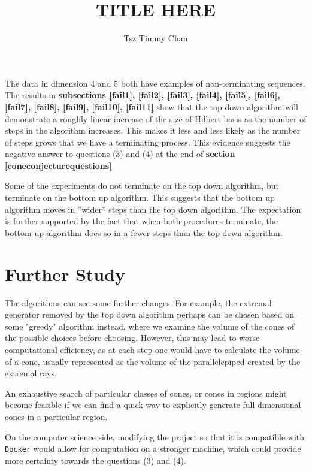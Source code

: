 \documentclass{TC}
\title{TITLE HERE}	%
\author{Tsz Timmy Chan}	%
\begin{document}
The data in dimension 4 and 5 both have examples of non-terminating sequences. The results in \textbf{subsections \ref{fail1}, \ref{fail2}, \ref{fail3}, \ref{fail4}, \ref{fail5}, \ref{fail6}, \ref{fail7}, \ref{fail8}, \ref{fail9}, \ref{fail10}, \ref{fail11}} show that the top down algorithm will demonstrate a roughly linear increase of the size of Hilbert basis as the number of steps in the algorithm increases. This makes it less and less likely as the number of
steps grows that we have a terminating process. This evidence suggests the negative
answer to questions (3) and (4) at the end of \textbf{section \ref{coneconjecturequestions}} 

Some of the experiments do not terminate on the top down algorithm, but terminate on the bottom up algorithm. This suggests that the bottom up algorithm moves in ”wider” steps than the top down algorithm. The expectation is further supported by the fact that when both procedures terminate, the bottom up algorithm does so in a fewer steps than the top down algorithm.


\section{Further Study}
The algorithms can see some further changes. For example, the extremal generator removed by the top down algorithm perhaps can be chosen based on some "greedy" algorithm instead, where we examine the volume of the cones of the possible choices before choosing. However, this may lead to worse computational efficiency, as at each step one would have to calculate the volume of a cone, usually represented as the volume of the parallelepiped created by the extremal rays. 


An exhaustive search of particular classes of cones, or cones in regions might become feasible if we can find a quick way to explicitly generate full dimensional cones in a particular region.

On the computer science side, modifying the project so that it is compatible with \texttt{Docker} would allow for computation on a stronger machine, which could provide more certainty towards the questions (3) and (4). 
\end{document}
